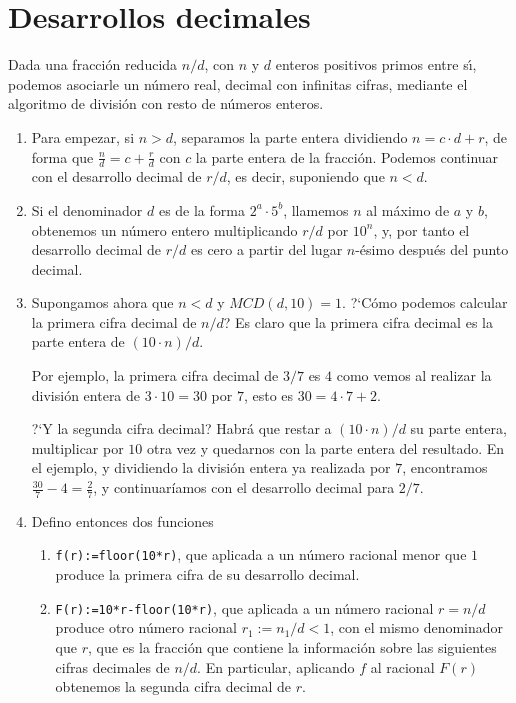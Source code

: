 \section{Desarrollos decimales}\label{decimales}
Dada una fracci\'on reducida $n/d$, con $n$ y $d$ enteros positivos primos entre
s\'{\i}, podemos asociarle un n\'umero real, decimal con infinitas cifras, 
mediante el algoritmo de divisi\'on con resto de n\'umeros enteros.
\begin{enumerate}
\item Para empezar, si $n>d$,  separamos la parte entera  dividiendo
$n=c\cdot d+r$,  de forma que $\frac{n}{d}=c+\frac{r}{d}$ con $c$ la parte
entera de la fracci\'on. Podemos continuar con el desarrollo decimal de $r/d$,
es decir, suponiendo que $n<d.$
\item Si el denominador $d$ es de la forma $2^a\cdot 5^b$, llamemos $n$ al
m\'aximo de $a$ y $b$,  obtenemos un n\'umero entero multiplicando $r/d$ por
$10^n$, y, por tanto el desarrollo decimal de $r/d$ es  cero a partir del lugar
$n$-\'esimo despu\'es del punto decimal.

\item Supongamos ahora que $n<d$ y  $MCD(d,10)=1.$ ?`C\'omo podemos calcular la
primera cifra decimal de $n/d$? Es claro que la primera cifra decimal es la
parte entera de $(10\cdot n)/d$. 

Por ejemplo, la primera cifra decimal de $3/7$ es $4$ como vemos al realizar la
división entera de $3\cdot10=30$ por $7$, esto es
$30=4\cdot 7+2$.

?`Y la segunda cifra decimal? Habr\'a que restar a $(10\cdot n)/d$ su parte
entera, multiplicar por $10$ otra vez y quedarnos con la parte entera del
resultado. En el ejemplo, y dividiendo la división entera ya realizada por $7$,
encontramos $\frac{30}7-4=\frac27$, y continuaríamos con el desarrollo decimal
para $2/7$.

\item Defino entonces dos  funciones
\begin{enumerate}
\item \lstinline|f(r):=floor(10*r)|, que aplicada a un n\'umero racional menor
que $1$ produce la primera cifra de su desarrollo decimal.

 \item \lstinline|F(r):=10*r-floor(10*r)|, que aplicada a
un n\'umero racional $r=n/d$ produce otro n\'umero racional $r_1:=n_1/d<1$, con
el mismo denominador que $r$, que es la fracci\'on que contiene la informaci\'on
sobre las siguientes cifras decimales de $n/d.$
En particular, aplicando $f$ al racional $F(r)$ obtenemos la segunda cifra
decimal de $r$. 
\end{enumerate}


\end{enumerate}
